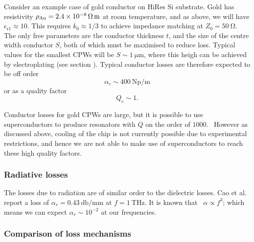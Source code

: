 Consider an example case of gold conductor on HiRes Si substrate. Gold has
resistivity $\rho_\mathrm{Au} = \SI{2.4E-8}{\ohm\metre}$ at room temperature,
and as above, we will have $\epsilon_\mathrm{r1} \approx 10$. This requires $k_0
\approx 1/3$ to achieve impedance matching at $Z_0 = \SI{50}{\ohm}$. The only
free parameters are the conductor thickness $t$, and the size of the centre
width conductor $S$, both of which must be maximised to reduce loss. Typical
values for the smallest CPWs will be $S\sim\SI{1}{\micro\metre}$, where
this heigh can be achieved by electroplating (see section ). Typical
conductor losses are therefore expected to be off order
\begin{equation}
  \alpha_c \sim \SI{400}{\neper\per\metre}
\end{equation}
or as a quality factor
\begin{equation}
  Q_c \sim 1.
\end{equation}

Conductor losses for gold CPWs are large, but it is possible to use
superconductors to produce resonators with $Q$ on the order of
$1000$.~\cite{Booth1999, Wallraff2004} However as discussed above, cooling of
the chip is not currently possible due to experimental restrictions, and hence
we are not able to make use of superconductors to reach these high quality
factors.

\subsubsection*{Radiative losses}


The losses due to radiation are of similar order to the dielectric losses. Cao et
al.~\cite{L.Cao2013} report a loss of $\alpha_r = \SI{0.43}{\decibel \per \milli
\meter}$ at $f=\SI{1}{\tera\hertz}$. It is known that~\cite{81658} $\alpha
\propto f^3$; which means we can expect $\alpha_r \sim 10^{-2}$  at
our frequencies.

\subsubsection*{Comparison of loss mechanisms}



